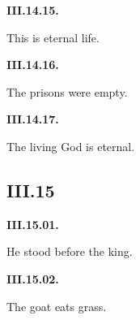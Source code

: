 \par\begin{minipage}{\linewidth}\raggedright
\textbf{III.14.15.}

This is eternal life.

\end{minipage}\par\addvspace{4pt}

\par\begin{minipage}{\linewidth}\raggedright
\textbf{III.14.16.}

The prisons were empty.

\end{minipage}\par\addvspace{4pt}

\par\begin{minipage}{\linewidth}\raggedright
\textbf{III.14.17.}

The living God is eternal.

\end{minipage}\par\addvspace{4pt}

\subsection*{III.15}

\par\begin{minipage}{\linewidth}\raggedright
\textbf{III.15.01.}

He stood before the king.

\end{minipage}\par\addvspace{4pt}

\par\begin{minipage}{\linewidth}\raggedright
\textbf{III.15.02.}

The goat eats grass.

\end{minipage}\par\addvspace{4pt}

